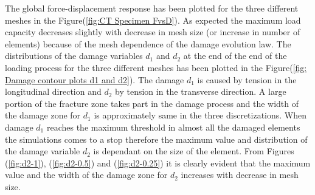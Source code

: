 \documentclass[a4paper,12pt,twoside]{report}
\begin{document}
\indent\indent\indent  The global force-displacement response has been plotted for the three different meshes in the Figure(\ref{fig:CT Specimen FvsD}). As expected the maximum load capacity decreases slightly with decrease in mesh size (or increase in number of elements) because of the mesh dependence of the damage evolution law. The distributions of the damage variables $d_{1}$ and $d_{2}$ at the end of the end of the loading process for the three different meshes has been plotted in the Figure(\ref{fig: Damage contour plots d1 and d2}). The damage $d_{1}$ is caused by tension in the longitudinal direction and $d_{2}$ by tension in the transverse direction.  A large portion of the fracture zone takes part in the damage process and the width of the damage zone for $d_{1}$ is approximately same in the three discretizations. When damage $d_{1}$ reaches the maximum threshold in almost all the damaged elements the simulations comes to a stop therefore the maximum value and distribution of the damage variable $d_{2}$ is dependant on the size of the element. From Figures (\ref{fig:d2-1}), (\ref{fig:d2-0.5}) and (\ref{fig:d2-0.25}) it is clearly evident that the maximum value and the width of the damage zone for $d_{2}$ increases with decrease in mesh size.\\ \\ 
\end{document}
